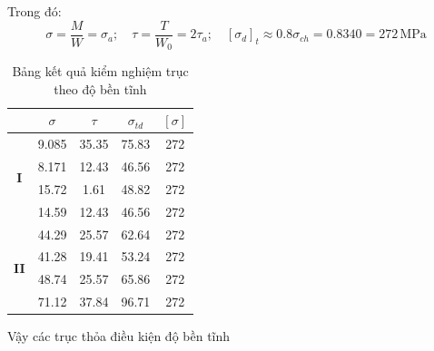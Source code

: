 Trong đó:
\[
\sigma = \frac{M}{W} = \sigma_a; \quad \tau = \frac{T}{W_0} = 2\tau_a; \quad [\sigma_d]_t \approx 0.8\sigma_{ch} = 0.8340 = 272 \, \text{MPa}
\]
\begin{table}[H]
\centering
\begin{tabular}{|c|c|c|c|c|}
    \hline
      & $\sigma$ & $\tau$ & $\sigma_{td}$ & $[\sigma]$ \\
    \hline
    \multirow{4}{*}{\textbf{I}} &9.085 & 35.35 & 75.83 & 272 \\
    \cline{2-5}
     & 8.171 & 12.43 & 46.56 & 272 \\
     \cline{2-5}
     & 15.72 & 1.61 & 48.82 & 272 \\
     \cline{2-5}
     & 14.59 & 12.43 & 46.56 & 272 \\
     \hline
     \multirow{4}{*}{\textbf{II}} & 44.29 & 25.57 & 62.64 & 272 \\
     \cline{2-5}
      & 41.28 & 19.41 & 53.24 & 272 \\
      \cline{2-5}
      & 48.74 & 25.57 & 65.86 & 272 \\
      \cline{2-5}
      & 71.12 & 37.84 & 96.71 & 272 \\
      \hline
\end{tabular}
\caption{Bảng kết quả kiểm nghiệm trục theo độ bền tĩnh}
\end{table}
Vậy các trục thỏa điều kiện độ bền tĩnh